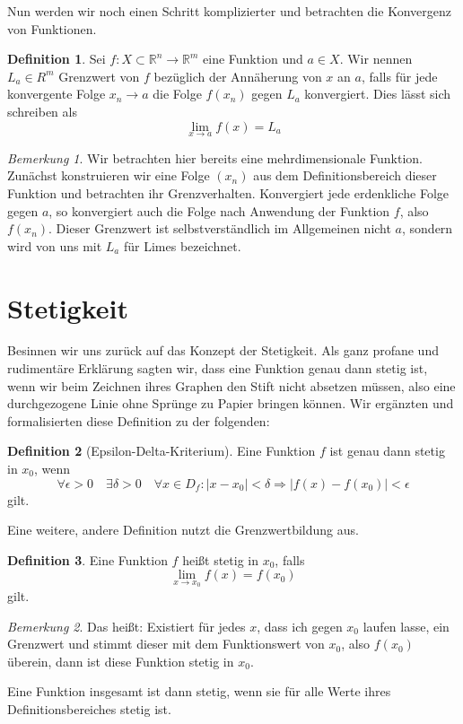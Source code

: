 \documentclass[11pt,a4paper]{scrartcl}
\theoremstyle{remark}
\newtheorem{note}{Bemerkung}
\theoremstyle{definition}
\newtheorem{definition}{Definition}[section]
\begin{document}
Nun werden wir noch einen Schritt komplizierter und betrachten die Konvergenz von Funktionen.
\begin{definition}
Sei $f: X \subset \mathbb{R}^{n} \to \mathbb{R}^{m}$ eine Funktion und $a \in X$. Wir nennen $L_a \in R^{m}$ Grenzwert von $f$ bezüglich der Annäherung von $x$ an $a$, falls für jede konvergente Folge $x_n \to a$ die Folge $f(x_n)$ gegen $L_a$ konvergiert. Dies lässt sich schreiben als \[
\lim _{x \to a} f(x) = L_a \]
\end{definition}
\begin{note}
Wir betrachten hier bereits eine mehrdimensionale Funktion. Zunächst konstruieren wir eine Folge $(x_n)$ aus dem Definitionsbereich dieser Funktion und betrachten ihr Grenzverhalten. Konvergiert jede erdenkliche Folge gegen $a$, so konvergiert auch die Folge nach Anwendung der Funktion $f$, also $f(x_n)$. Dieser Grenzwert ist selbstverständlich im Allgemeinen nicht $a$, sondern wird von uns mit $L_a$ für {\glqq}Limes{\grqq} bezeichnet. 
\end{note}
\section{Stetigkeit}
Besinnen wir uns zurück auf das Konzept der Stetigkeit. Als ganz profane und rudimentäre Erklärung sagten wir, dass eine Funktion genau dann stetig ist, wenn wir beim Zeichnen ihres Graphen den Stift nicht absetzen müssen, also eine durchgezogene Linie ohne Sprünge zu Papier bringen können. Wir ergänzten und formalisierten diese Definition zu der folgenden:
\begin{definition}[Epsilon-Delta-Kriterium]
Eine Funktion $f$ ist genau dann stetig in $x_0$, wenn \[
\forall \epsilon > 0 \quad \exists \delta > 0 \quad \forall x \in D_f: \vert x - x_0 \vert < \delta \Rightarrow \vert f(x) - f(x_0) \vert < \epsilon \] gilt.
\end{definition}
Eine weitere, andere Definition nutzt die Grenzwertbildung aus.
\begin{definition}
Eine Funktion $f$ heißt stetig in $x_0$, falls 
\[\lim _{x \to x_0} f(x) = f(x_0)\] gilt.
\end{definition}
\begin{note}
Das heißt: Existiert für jedes $x$, dass ich gegen $x_0$ laufen lasse, ein Grenzwert und stimmt dieser mit dem Funktionswert von $x_0$, also $f(x_0)$ überein, dann ist diese Funktion stetig in $x_0$.
\end{note}
Eine Funktion insgesamt ist dann stetig, wenn sie für alle Werte ihres Definitionsbereiches stetig ist. 
\end{document}
